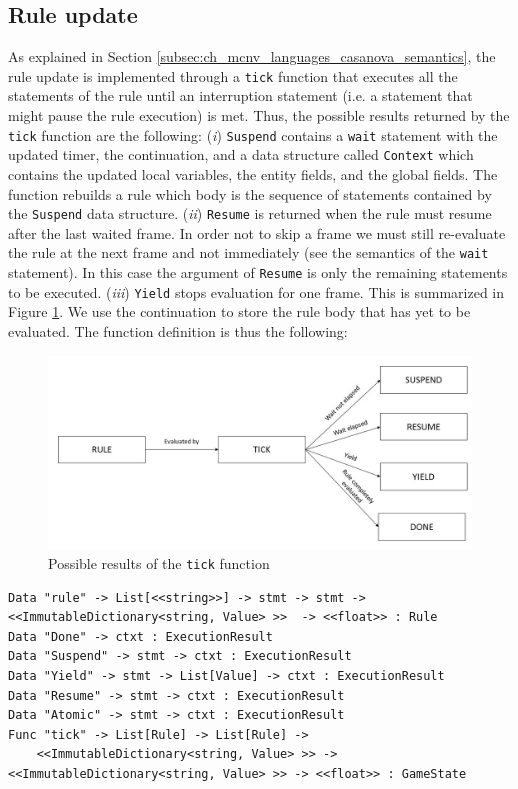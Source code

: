 \subsection{Rule update}
\label{subsec:ch_mcnv_languages_rule_update}
As explained in Section \ref{subsec:ch_mcnv_languages_casanova_semantics}, the rule update is implemented through a \texttt{tick} function that executes all the statements of the rule until an interruption statement (i.e. a statement that might pause the rule execution) is met. Thus, the possible results returned by the \texttt{tick} function are the following: (\textit{i}) \texttt{Suspend} contains a \texttt{wait} statement with the updated timer, the continuation, and a data structure called \texttt{Context} which contains the updated local variables, the entity fields, and the global fields. The function rebuilds a rule which body is the sequence of statements contained by the \texttt{Suspend} data structure. (\textit{ii}) \texttt{Resume} is returned when the rule must resume after the last waited frame. In order not to skip a frame we must still re-evaluate the rule at the next frame and not immediately (see the semantics of the \texttt{wait} statement). In this case the argument of \texttt{Resume} is only the remaining statements to be executed. (\textit{iii}) \texttt{Yield} stops evaluation for one frame. This is summarized in Figure \ref{fig:ch_mcnv_languages_tick_result}. We use the continuation to store the rule body that has yet to be evaluated. The function definition is thus the following:

\begin{figure}
	\centering
	\includegraphics[width=\textwidth]{Figures/tick}
	\caption{Possible results of the \texttt{tick} function}
	\label{fig:ch_mcnv_languages_tick_result}
\end{figure}

\begin{lstlisting}
Data "rule" -> List[<<string>>] -> stmt -> stmt -> <<ImmutableDictionary<string, Value> >>  -> <<float>> : Rule
Data "Done" -> ctxt : ExecutionResult
Data "Suspend" -> stmt -> ctxt : ExecutionResult
Data "Yield" -> stmt -> List[Value] -> ctxt : ExecutionResult
Data "Resume" -> stmt -> ctxt : ExecutionResult
Data "Atomic" -> stmt -> ctxt : ExecutionResult
Func "tick" -> List[Rule] -> List[Rule] -> 
	<<ImmutableDictionary<string, Value> >> -> <<ImmutableDictionary<string, Value> >> -> <<float>> : GameState   
\end{lstlisting}

